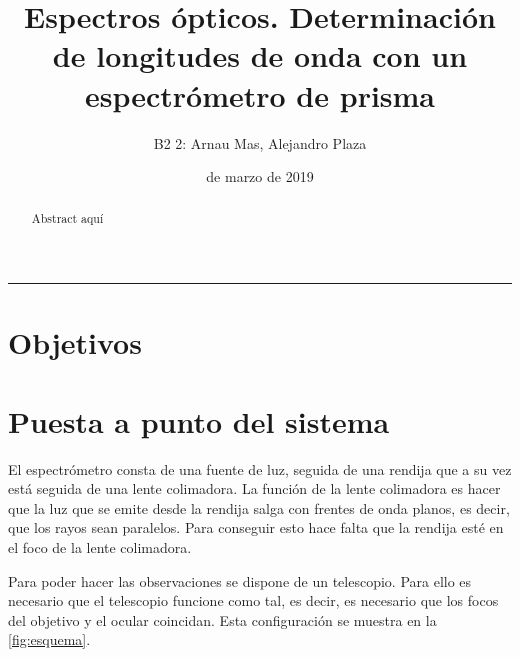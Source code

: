 \documentclass[12pt]{article}
\title{\sffamily {\bfseries Práctica 4:} Espectros ópticos. Determinación de longitudes de onda con un espectrómetro de prisma}
\author{\sffamily B2 2: Arnau Mas, Alejandro Plaza}
\date{\sffamily 14 de marzo de 2019}
\numberwithin{table}{section}
\numberwithin{figure}{section}
\numberwithin{equation}{section}
\begin{document}
\maketitle
\renewcommand{\abstractname}{\sffamily \bfseries Resumen:}
\begin{abstract}
Abstract aquí
\end{abstract}
\hrule

\section{Objetivos}

\section{Puesta a punto del sistema}
El espectrómetro consta de una fuente de luz, seguida de una rendija que a su vez está seguida de una lente colimadora. La función de la lente colimadora es hacer que la luz que se emite desde la rendija salga con frentes de onda planos, es decir, que los rayos sean paralelos. Para conseguir esto hace falta que la rendija esté en el foco de la lente colimadora. 

Para poder hacer las observaciones se dispone de un telescopio. Para ello es necesario que el telescopio funcione como tal, es decir, es necesario que los focos del objetivo y el ocular coincidan. Esta configuración se muestra en la \cref{fig:esquema}.
\end{document}
